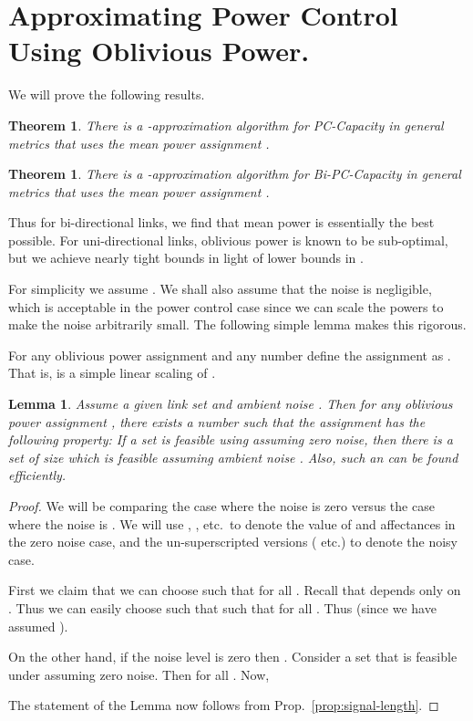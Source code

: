 \documentclass[11pt]{amsart}
\newcommand{\prob}[1]{\textsf{#1}}  \newcommand{\myparagraph}[1]{\smallskip\noindent\textbf{#1}\quad}
\newcounter{foo}
\newtheorem{theorem}[foo]{Theorem}
\newtheorem{lemma}[foo]{Lemma}
\begin{document}
\section{Approximating Power Control Using Oblivious Power.}


We will prove the following results.
\begin{theorem}
\label{pcunidir}
There is a -approximation algorithm for
\prob{PC-Capacity} in general metrics that uses the mean power
assignment .
\end{theorem}

\begin{theorem}
\label{pcbidir}
There is a -approximation algorithm for \prob{Bi-PC-Capacity} in
general metrics  that uses the mean power
assignment .
\end{theorem}



Thus for bi-directional links,
we find that mean power is essentially the best possible. For uni-directional links, oblivious
power is known to be sub-optimal, but we achieve nearly tight bounds in light
of lower bounds in \cite{us:esa09full}.

For simplicity we assume .
We shall also assume that the noise  is negligible, 
which is acceptable in the power control case since
we can scale the powers to make the noise arbitrarily small. The following simple lemma 
makes this rigorous.

For any oblivious power assignment  and any number  define the assignment
 as . That is,  is a simple
linear scaling of .

\begin{lemma}
Assume a given link set  and ambient noise .
Then for any oblivious power assignment , there exists a number  such that the assignment
 has the following property: If a set  is feasible using  assuming
zero noise, then there is a set  of size  which is feasible assuming ambient noise .
Also, such an  can be found efficiently.
\end{lemma}
\begin{proof}
We will be comparing the case where the noise is zero versus the case
where the noise is . We will use , , 
etc.\ to denote the value of  and affectances in the zero noise
case, and the un-superscripted versions ( etc.)
to denote the noisy case.

First we claim that we can choose  such that
 for all . Recall that 
depends only on . Thus we can easily choose  such that 
 such that 
for all . Thus  (since we have assumed ).

On the other hand, if the noise level is zero then . 
Consider a set  that is feasible under  assuming zero noise. 
Then  for all . 
Now, 

The statement of the Lemma now follows from Prop.~\ref{prop:signal-length}.
\end{proof}
\end{document}
